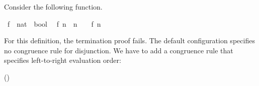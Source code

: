 \begin{isabellebody}
\begin{isamarkuptext}
  Consider the following function.%
\end{isamarkuptext}%
\isamarkuptrue%
\isamarkupfalse%
\ f\ {}{}\ {}nat\ {}\ bool{}\isanewline
{}\isanewline
\ \ {}f\ n\ {}\ {}n\ {}\ {}\ {}\ f\ {}n\ {}\ {}{}{}{}%
\isadelimproof
%
\endisadelimproof
%
\isatagproof
%
\endisatagproof
{\isafoldproof}%
%
\isadelimproof
%
\endisadelimproof
%
\begin{isamarkuptext}%
For this definition, the termination proof fails. The default configuration
  specifies no congruence rule for disjunction. We have to add a
  congruence rule that specifies left-to-right evaluation order:

  \vspace{1ex}
  \noindent {}\hfill()
  \vspace{1ex}


\end{isamarkuptext}
\end{isabellebody}

